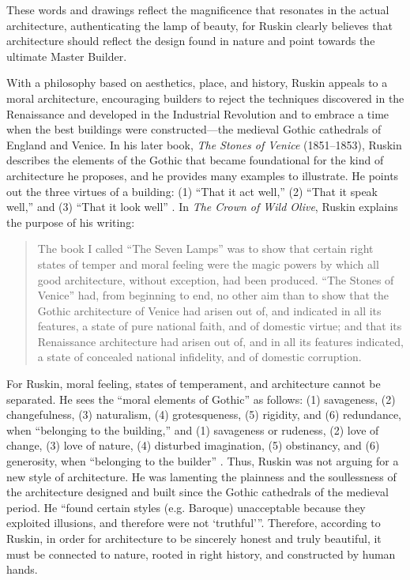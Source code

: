 
These words and drawings reflect the magnificence that resonates in the
actual architecture, authenticating the lamp of beauty, for Ruskin
clearly believes that architecture should reflect the design found in
nature and point towards the ultimate Master Builder.  

With a philosophy based on aesthetics, place, and history, Ruskin
appeals to a moral architecture, encouraging builders to reject the
techniques discovered in the Renaissance and developed in the
Industrial Revolution and to embrace a time when the best buildings
were constructed—the medieval Gothic cathedrals of England and Venice. 
In his later book, \textit{The Stones of Venice }(1851--1853), Ruskin
describes the elements of the Gothic that became foundational for the
kind of architecture he proposes, and he provides many examples to
illustrate.  He points out the three virtues of a building: (1) “That
it act well,” (2) “That it speak well,” and (3) “That it look well” \citep[][vol. 1, ch. 2, sec. 1]{ruskin1885}.  
In \textit{The Crown of Wild Olive}, Ruskin
explains the purpose of his writing: 


\begin{quote}
The book I called ``The Seven Lamps'' was to show that certain right
states of temper and moral feeling were the magic powers by which all
good architecture, without exception, had been produced. 
``The Stones of Venice'' had, from beginning to end, no
other aim than to show that the Gothic architecture of Venice had
arisen out of, and indicated in all its features, a state of pure
national faith, and of domestic virtue; and that its Renaissance
architecture had arisen out of, and in all its features indicated, a
state of concealed national infidelity, and of  domestic corruption. 
\citep[][pg. 53]{ruskin1866}
\end{quote}

For Ruskin, moral feeling, states of temperament, and architecture
cannot be separated.  He sees the ``moral elements of Gothic'' as
follows: (1) savageness, (2) changefulness, (3) naturalism, (4)
grotesqueness, (5) rigidity, and (6) redundance, when “belonging to the
building,” and (1) savageness or rudeness, (2) love of change, (3) love
of nature, (4) disturbed imagination, (5) obstinancy, and (6)
generosity, when “belonging to the builder” \citep[][pg. 155]{ruskin1885}
.  Thus, Ruskin was not arguing for a new style of architecture. 
He was lamenting the plainness and the soullessness of the architecture
designed and built since the Gothic cathedrals of the medieval period. 
He “found certain
styles (e.g. Baroque) unacceptable because they exploited illusions,
and therefore were not `truthful'”\citep[][pg. 669]{curl2006}.
Therefore, according to Ruskin, in order for architecture
to be sincerely honest and truly beautiful, it must be connected to
nature, rooted in right history, and constructed by human hands.  

